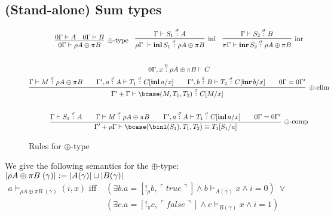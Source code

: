 \documentclass[12pt,a4paper]{article}
\begin{document}
\subsection{(Stand-alone) Sum types}
\begin{figure}[h]
  \begin{gather*}
    \begin{align*}
      \infer[\oplus\text{-type}]{0\Gamma \vdash \rho A \oplus \pi B}{
        0\Gamma \vdash A &
        0\Gamma \vdash B} & & 
      \infer[\text{inl}]{\rho \Gamma \ \vdash \mathbf{inl}\, S_1 \of \sigma \rho A \oplus \pi B}{
        \Gamma \vdash S_1 \of{\sigma} A} & &
      \infer[\text{inr}]{\pi\Gamma \vdash \mathbf{inr}\, S_2 \of \sigma \rho A \oplus \pi B}{
        \Gamma \vdash S_2 \of{\sigma} B
      }
    \end{align*}\\
    \\
    0\Gamma, x \of{0} \rho A \oplus \pi B \vdash C \\
    \infer[\oplus \text{-elim}]{\Gamma' + \Gamma \vdash \bcase(M , T_1 , T_2)\of{ \sigma}C[M/x]}{
      \Gamma \vdash M \of{\sigma} \rho A \oplus \pi B &&
      \Gamma', a \of {\rho} A \vdash T_1 \of{\sigma} C[\mathbf{inl}\, a/x] && 
      \Gamma', b \of{\pi} B \vdash T_2 \of{\sigma} C[\mathbf{inr}\, b/x] &&
      0\Gamma = 0\Gamma'    
    }\\
    \\
    \infer[\oplus \text{-comp}]{\Gamma' + \rho\Gamma \vdash \bcase(\binl(S_1), T_1, T_2) \equiv T_1[S_1 / a]}{
      \Gamma \vdash S_1 \of{\sigma} A &&
      \Gamma \vdash M \of{\sigma} \rho A \oplus \pi B &&
      \Gamma', a \of {\rho} A \vdash T_1 \of{\sigma} C[\mathbf{inl}\, a/x] && 
      0\Gamma = 0\Gamma'    
    }\\
  \end{gather*}
  \caption{Rules for $\oplus$-type}
\end{figure}
We give the following semantics for the $\oplus$-type:\\
$|\rho A \oplus \pi B\;(\gamma)| := |A(\gamma)| \sqcup |B(\gamma)|$\\
$\begin{aligned}
  a \vDash_{\rho A \oplus \pi B\;(\gamma)} (i , x) \text{ iff } &(\exists b .  a =[!_\rho b, \ulcorner true \urcorner] \land b \vDash_{A(\gamma)} x \land i = 0)\; \lor \\
  &(\exists c .  a =[!_\pi c, \ulcorner false \urcorner] \land c \vDash_{B(\gamma)} x \land i = 1)
\end{aligned}$
\end{document}
